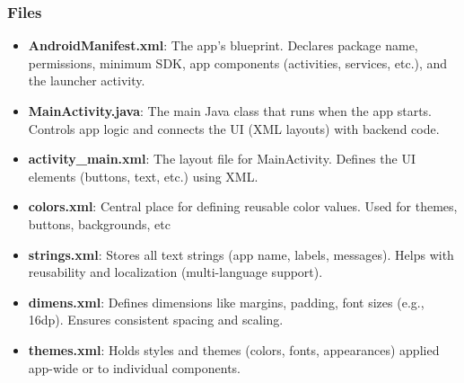 \documentclass{report}
\begin{document}
    \pagebreak 
    \subsubsection{Files}
    \begin{itemize}
        \item \textbf{AndroidManifest.xml}: The app’s blueprint. Declares package name, permissions, minimum SDK, app components (activities, services, etc.), and the launcher activity.
        \item \textbf{MainActivity.java}: The main Java class that runs when the app starts. Controls app logic and connects the UI (XML layouts) with backend code.
        \item \textbf{activity\_main.xml}: The layout file for MainActivity. Defines the UI elements (buttons, text, etc.) using XML.
        \item \textbf{colors.xml}: Central place for defining reusable color values. Used for themes, buttons, backgrounds, etc
        \item \textbf{strings.xml}: Stores all text strings (app name, labels, messages). Helps with reusability and localization (multi-language support).
        \item \textbf{dimens.xml}:  Defines dimensions like margins, padding, font sizes (e.g., 16dp). Ensures consistent spacing and scaling.
        \item \textbf{themes.xml}: Holds styles and themes (colors, fonts, appearances) applied app-wide or to individual components.
    \end{itemize}

    \pagebreak 
\end{document}
